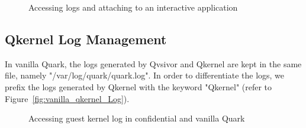 \begin{figure}[!htb]


  
    \caption[Accessing logs and attaching to an interactive application ]{Accessing logs and attaching to an interactive application }
\end{figure}



\subsection{Qkernel Log Management}

In vanilla Quark, the logs generated by Qvsivor and Qkernel are kept in the same file, namely "/var/log/quark/quark.log". In order to differentiate the logs, we prefix the logs generated by Qkernel with the keyword "Qkernel" (refer to Figure~\ref{fig:vanilla_qkernel_Log}).
\begin{figure}[!htb]


  
    \caption[Accessing guest kernel log in confidential and vanilla Quark]{Accessing guest kernel log in confidential and vanilla Quark}
\end{figure}


